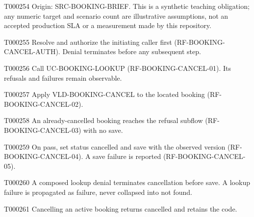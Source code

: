 \documentclass[11pt,a4paper]{article}
\begin{document}
\begin{atlasparagraph}{T000254}
Origin: SRC-BOOKING-BRIEF. This is a synthetic teaching obligation; any numeric target and scenario count are illustrative assumptions, not an accepted production SLA or a measurement made by this repository.
\end{atlasparagraph}
\begin{atlasparagraph}{T000255}
Resolve and authorize the initiating caller first (RF-BOOKING-CANCEL-AUTH). Denial terminates before any subsequent step.
\end{atlasparagraph}
\begin{atlasparagraph}{T000256}
Call UC-BOOKING-LOOKUP (RF-BOOKING-CANCEL-01). Its refusals and failures remain observable.
\end{atlasparagraph}
\begin{atlasparagraph}{T000257}
Apply VLD-BOOKING-CANCEL to the located booking (RF-BOOKING-CANCEL-02).
\end{atlasparagraph}
\begin{atlasparagraph}{T000258}
An already-cancelled booking reaches the refusal subflow (RF-BOOKING-CANCEL-03) with no save.
\end{atlasparagraph}
\begin{atlasparagraph}{T000259}
On pass, set status cancelled and save with the observed version (RF-BOOKING-CANCEL-04). A save failure is reported (RF-BOOKING-CANCEL-05).
\end{atlasparagraph}
\begin{atlasparagraph}{T000260}
A composed lookup denial terminates cancellation before save. A lookup failure is propagated as failure, never collapsed into not found.
\end{atlasparagraph}
\begin{atlasparagraph}{T000261}
Cancelling an active booking returns cancelled and retains the code.
\end{atlasparagraph}
\end{document}
